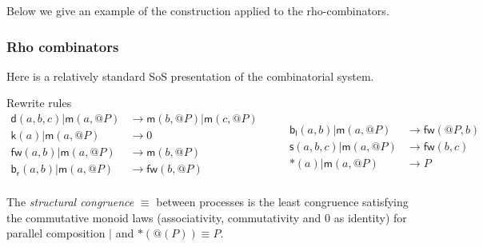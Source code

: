 \documentclass{llncs}
\makeatletter
\renewcommand{\:}{\colon}
\newcommand{\bc}{\mathbin{\mathbf{::=}}}
\newcommand{\bm}{\mathbin{\mathbf\mid}}
\newcommand{\quotep}[1]{\mathsf{@}#1}
\newcommand{\red}{\rightarrow}
\newcommand{\scong}{\mathbin{\equiv}}
\newcommand{\pzero}{\mathbin{0}}
\makeatother
\begin{document}
Below we give an example of the construction applied to the rho-combinators.
\subsubsection{Rho combinators}
Here is a relatively standard SoS presentation of the combinatorial system. 


Rewrite rules
\[\begin{array}{rl}
\mathsf{d}(a,b,c) | \mathsf{m}(a,\quotep{P}) & \red \mathsf{m}(b,\quotep{P}) | \mathsf{m}(c,\quotep{P}) \\
\mathsf{k}(a) | \mathsf{m}(a,\quotep{P}) & \red 0 \\
\mathsf{fw}(a,b) | \mathsf{m}(a,\quotep{P}) & \red \mathsf{m}(b,\quotep{P}) \\
\mathsf{b}_{\mathsf{r}}(a,b) | \mathsf{m}(a,\quotep{P}) & \red \mathsf{fw}(b,\quotep{P}) \\  
\end{array} \quad \quad
\begin{array}{rl}
  \mathsf{b}_{\mathsf{l}}(a,b) | \mathsf{m}(a,\quotep{P}) & \red \mathsf{fw}(\quotep{P},b) \\
  \mathsf{s}(a,b,c) | \mathsf{m}(a,\quotep{P}) & \red \mathsf{fw}(b,c) \\
  *(a) | \mathsf{m}(a,\quotep{P}) & \red P
\end{array}\]

\begin{definition}
  The {\em structural congruence} $\equiv$
  between processes \cite{SangiorgiWalker} is the least congruence
  satisfying the commutative monoid laws
  (associativity, commutativity and $\pzero$ as identity) for parallel
  composition $|$ and $*(@(P)) \equiv P$.
\end{definition}
\end{document}

